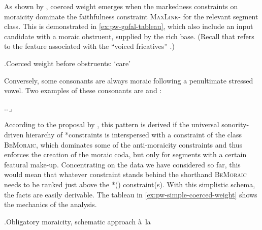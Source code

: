 As shown by \citet{moren01:_distin}, coerced weight emerges when the markedness constraints on moraicity dominate the faithfulness constraint \textsc{MaxLink}-\mo{} for the relevant segment class. This is demonstrated in \cref{ex:pw-gofal-tableau}, which also include an input candidate with a moraic obstruent, supplied by the rich base. (Recall that  refers to the feature  associated with the \enquote{voiced fricatives} \ipa{[v~ð]}.)

\ex.\label{ex:pw-gofal-tableau}Coerced weight before obstruents: \ipa{[ˈɡoːval]} `care'\\
\begin{OTmultitableau}{4}
\end{OTmultitableau}

Conversely, some consonants are always moraic following a penultimate stressed vowel. Two examples of these consonants are \ipa{[m]} and \ipa{[ŋ]}:

\ex.\a.
\b.

According to the proposal by \citet{moren01:_distin}, this pattern is derived if  the universal sonority\hyp driven hierarchy of *\mo constraints is interspersed with a constraint of the class \textsc{BeMoraic}, which dominates some of the anti\hyp moraicity constraints and thus enforces the creation of the moraic coda, but only for segments with a certain featural make-up. Concentrating on the data we have considered so far, this would mean that whatever constraint stands behind the shorthand \textsc{BeMoraic} needs to be ranked just above the *\mo() constraint(s). With this simplistic schema, the facts are easily derivable. The tableau in \ref{ex:pw-simple-coerced-weight} shows the mechanics of the analysis.

\ex.\label{ex:pw-simple-coerced-weight}Obligatory moraicity, schematic approach à~la \citet{moren01:_distin}\\
\begin{OTmultitableau}{4}
\OTmcandrow[][\OThand]{[ɬo\smo[ŋ\smo]e]}{,,*,*}
\OTmcandrow[][\OThand]{[ɬo\smo[ŋ\smo]e]}{,,*,}
\OTmcandrow{[ɡo\smo[v\smo]al]}{*!,,,}
\end{OTmultitableau}

